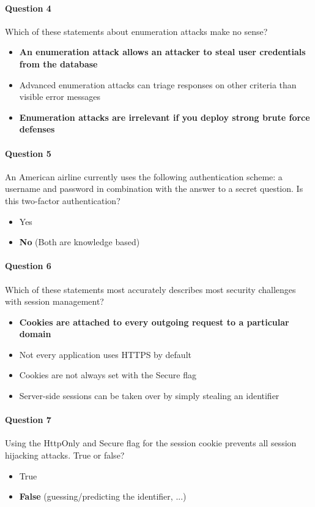 \documentclass[titlepage]{article}
\begin{document}
    \paragraph{Question 4} Which of these statements about enumeration attacks make no sense?
    \begin{itemize}
        \item \textbf{An enumeration attack allows an attacker to steal user credentials from the database} \checkmark
        \item Advanced enumeration attacks can triage responses on other criteria than visible error messages
        \item \textbf{Enumeration attacks are irrelevant if you deploy strong brute force defenses} \checkmark
    \end{itemize}
    \paragraph{Question 5} An American airline currently uses the following authentication scheme: a username and password in combination with the answer to a secret question. Is this two-factor authentication?
    \begin{itemize}
        \item Yes
        \item \textbf{No} \checkmark (Both are knowledge based)
    \end{itemize}
    \paragraph{Question 6} Which of these statements most accurately describes most security challenges with session management?
    \begin{itemize}
        \item \textbf{Cookies are attached to every outgoing request to a particular domain} \checkmark
        \item Not every application uses HTTPS by default
        \item Cookies are not always set with the Secure flag
        \item Server-side sessions can be taken over by simply stealing an identifier
    \end{itemize}
    \paragraph{Question 7} Using the HttpOnly and Secure flag for the session cookie prevents all session hijacking attacks. True or false?
    \begin{itemize}
        \item True
        \item \textbf{False} \checkmark (guessing/predicting the identifier, ...)
    \end{itemize}
\end{document}
